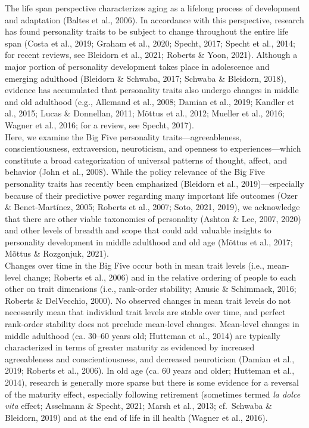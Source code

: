\documentclass[
  english,
  man, noextraspace]{apa7}
\begin{document}
The life span perspective characterizes aging as a lifelong process of development and adaptation (Baltes et al., 2006). In accordance with this perspective, research has found personality traits to be subject to change throughout the entire life span (Costa et al., 2019; Graham et al., 2020; Specht, 2017; Specht et al., 2014; for recent reviews, see Bleidorn et al., 2021; Roberts \& Yoon, 2021). Although a major portion of personality development takes place in adolescence and emerging adulthood (Bleidorn \& Schwaba, 2017; Schwaba \& Bleidorn, 2018), evidence has accumulated that personality traits also undergo changes in middle and old adulthood (e.g., Allemand et al., 2008; Damian et al., 2019; Kandler et al., 2015; Lucas \& Donnellan, 2011; Mõttus et al., 2012; Mueller et al., 2016; Wagner et al., 2016; for a review, see Specht, 2017).\\
Here, we examine the Big Five personality traits---agreeableness, conscientiousness, extraversion, neuroticism, and openness to experiences---which constitute a broad categorization of universal patterns of thought, affect, and behavior (John et al., 2008). While the policy relevance of the Big Five personality traits has recently been emphasized (Bleidorn et al., 2019)---especially because of their predictive power regarding many important life outcomes (Ozer \& Benet-Martínez, 2005; Roberts et al., 2007; Soto, 2021, 2019), we acknowledge that there are other viable taxonomies of personality (Ashton \& Lee, 2007, 2020) and other levels of breadth and scope that could add valuable insights to personality development in middle adulthood and old age (Mõttus et al., 2017; Mõttus \& Rozgonjuk, 2021).\\
Changes over time in the Big Five occur both in mean trait levels (i.e., mean-level change; Roberts et al., 2006) and in the relative ordering of people to each other on trait dimensions (i.e., rank-order stability; Anusic \& Schimmack, 2016; Roberts \& DelVecchio, 2000). No observed changes in mean trait levels do not necessarily mean that individual trait levels are stable over time, and perfect rank-order stability does not preclude mean-level changes. Mean-level changes in middle adulthood (ca. 30--60 years old; Hutteman et al., 2014) are typically characterized in terms of greater maturity as evidenced by increased agreeableness and conscientiousness, and decreased neuroticism (Damian et al., 2019; Roberts et al., 2006). In old age (ca. 60 years and older; Hutteman et al., 2014), research is generally more sparse but there is some evidence for a reversal of the maturity effect, especially following retirement (sometimes termed \emph{la dolce vita} effect; Asselmann \& Specht, 2021; Marsh et al., 2013; cf.~Schwaba \& Bleidorn, 2019) and at the end of life in ill health (Wagner et al., 2016).\\
\end{document}
